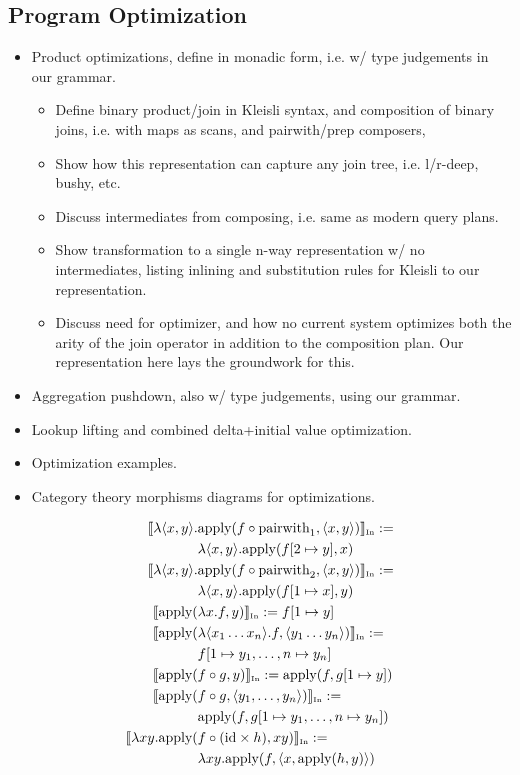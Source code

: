 \subsection{Program Optimization}
\begin{itemize}
  \item Product optimizations, define in monadic form, i.e. w/ type judgements
  in our grammar. 
  \begin{itemize}
    \item Define binary product/join in Kleisli syntax, and composition of
    binary joins, i.e. with maps as scans, and pairwith/prep composers,
    \item Show how this representation can capture any join tree, i.e.
    l/r-deep, bushy, etc.
    \item Discuss intermediates from composing, i.e. same as modern query plans.   
    \item Show transformation to a single n-way representation w/ no
    intermediates, listing inlining and substitution rules for Kleisli to our
    representation.
    \item Discuss need for optimizer, and how no current system optimizes both
    the arity of the join operator in addition to the composition plan. Our
    representation here lays the groundwork for this.
  \end{itemize}
  \item Aggregation pushdown, also w/ type judgements, using our grammar.
  \item Lookup lifting and combined delta+initial value optimization.
  \item Optimization examples.
  \item Category theory morphisms diagrams for optimizations.
\end{itemize}

\begin{align*}
\srin{\lambda \tuple{x,y}. & \apply(f \circ \ktpwl, \tuple{x,y})} :=
\\
    & \lambda \tuple{x,y}. \apply(f[2 \mapsto y], x)
\\
\srin{\lambda \tuple{x,y}. & \apply(f \circ \ktpwr, \tuple{x,y})} :=
\\
    & \lambda \tuple{x,y}. \apply(f[1 \mapsto x], y)
\\
\srin{\apply( & \lambda x.f, y)} := f[1 \mapsto y]
\\
\srin{\apply( & \lambda \tuple{x_1 \ldots x_n}.f, \tuple{y_1 \ldots y_n})} :=
\\
    & f[1 \mapsto y_1, \ldots, n \mapsto y_n]
\\
\srin{\apply(& f \circ g, y)} := \apply(f, g[1 \mapsto y])
\\
\srin{\apply(& f \circ g, \tuple{y_1,\ldots,y_n})} :=
\\
    & \apply(f, g[1 \mapsto y_1,\ldots,n \mapsto y_n])
\\
\srin{\lambda xy. \apply( & f \circ (\ktid \times h), xy)} :=
\\
    & \lambda xy. \apply(f, \tuple{x, \apply(h, y)})
\\
\end{align*}

